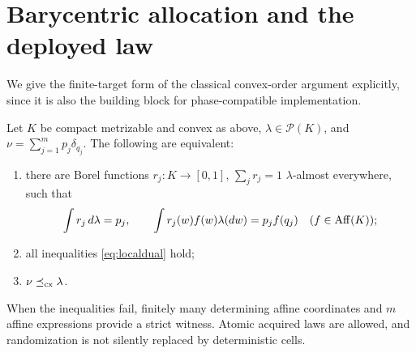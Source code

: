 \section{Barycentric allocation and the deployed law}\label{sec:allocation}
We give the finite-target form of the classical convex-order argument explicitly, since it is also the building block for phase-compatible implementation.

\begin{lemma}\label{lem:allocation}
Let $K$ be compact metrizable and convex as above, $\lambda\in\mathcal P(K)$, and $\nu=\sum_{j=1}^m p_j\delta_{q_j}$. The following are equivalent:
\begin{enumerate}
\item there are Borel functions $r_j:K\to[0,1]$, $\sum_jr_j=1$ $\lambda$-almost everywhere, such that
\begin{equation}\label{eq:moments}
 \int r_j\,d\lambda=p_j,\qquad
 \int r_j(w)f(w)\lambda(dw)=p_jf(q_j)\quad(f\in\operatorname{Aff}(K));
\end{equation}
\item all inequalities \eqref{eq:localdual} hold;
\item $\nu\preceq_{\rm cx}\lambda$.
\end{enumerate}
When the inequalities fail, finitely many determining affine coordinates and $m$ affine expressions provide a strict witness. Atomic acquired laws are allowed, and randomization is not silently replaced by deterministic cells.
\end{lemma}
